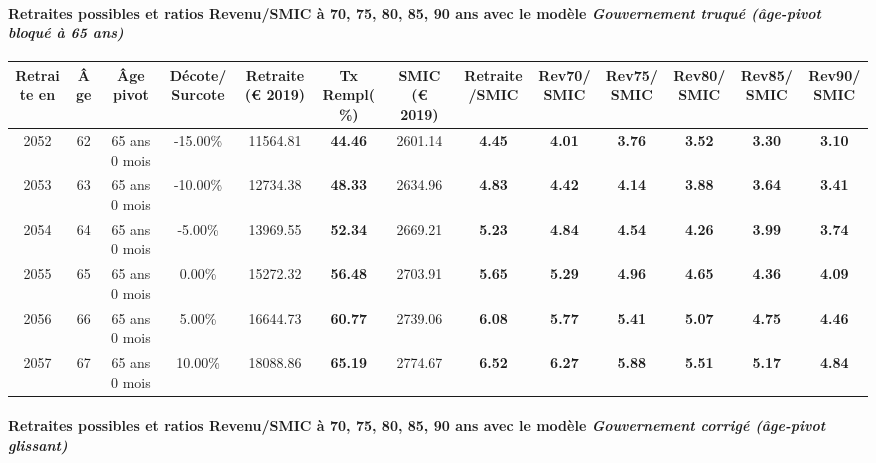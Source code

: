 \paragraph{Retraites possibles et ratios Revenu/SMIC à 70, 75, 80, 85, 90 ans avec le modèle \emph{Gouvernement truqué (âge-pivot bloqué à 65 ans)}}  
 
{ \scriptsize \begin{center} 
\begin{tabular}[htb]{|c|c||c|c||c|c||c||c|c|c|c|c|c|} 
\hline 
 Retraite en &  Âge &  Âge pivot &  Décote/Surcote &  Retraite (\euro{} 2019) &  Tx Rempl(\%) &  SMIC (\euro{} 2019) &  Retraite/SMIC &  Rev70/SMIC &  Rev75/SMIC &  Rev80/SMIC &  Rev85/SMIC &  Rev90/SMIC \\ 
\hline \hline 
 2052 &  62 &  65 ans 0 mois &  -15.00\% &  11564.81 &  {\bf 44.46} &  2601.14 &  {\bf 4.45} &  {\bf 4.01} &  {\bf 3.76} &  {\bf 3.52} &  {\bf 3.30} &  {\bf 3.10} \\ 
\hline 
 2053 &  63 &  65 ans 0 mois &  -10.00\% &  12734.38 &  {\bf 48.33} &  2634.96 &  {\bf 4.83} &  {\bf 4.42} &  {\bf 4.14} &  {\bf 3.88} &  {\bf 3.64} &  {\bf 3.41} \\ 
\hline 
 2054 &  64 &  65 ans 0 mois &  -5.00\% &  13969.55 &  {\bf 52.34} &  2669.21 &  {\bf 5.23} &  {\bf 4.84} &  {\bf 4.54} &  {\bf 4.26} &  {\bf 3.99} &  {\bf 3.74} \\ 
\hline 
 2055 &  65 &  65 ans 0 mois &  0.00\% &  15272.32 &  {\bf 56.48} &  2703.91 &  {\bf 5.65} &  {\bf 5.29} &  {\bf 4.96} &  {\bf 4.65} &  {\bf 4.36} &  {\bf 4.09} \\ 
\hline 
 2056 &  66 &  65 ans 0 mois &  5.00\% &  16644.73 &  {\bf 60.77} &  2739.06 &  {\bf 6.08} &  {\bf 5.77} &  {\bf 5.41} &  {\bf 5.07} &  {\bf 4.75} &  {\bf 4.46} \\ 
\hline 
 2057 &  67 &  65 ans 0 mois &  10.00\% &  18088.86 &  {\bf 65.19} &  2774.67 &  {\bf 6.52} &  {\bf 6.27} &  {\bf 5.88} &  {\bf 5.51} &  {\bf 5.17} &  {\bf 4.84} \\ 
\hline 
\hline 
\end{tabular} 
\end{center} } 
\paragraph{Retraites possibles et ratios Revenu/SMIC à 70, 75, 80, 85, 90 ans avec le modèle \emph{Gouvernement corrigé (âge-pivot glissant)}}  
 
